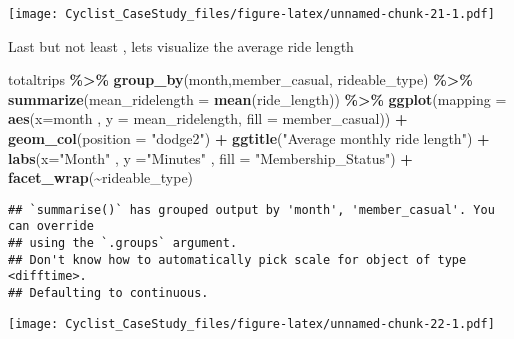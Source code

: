 \documentclass[
]{article}
\newenvironment{Shaded}{\begin{snugshade}}{\end{snugshade}}
\newcommand{\AttributeTok}[1]{\textcolor[rgb]{0.13,0.29,0.53}{#1}}
\newcommand{\FunctionTok}[1]{\textcolor[rgb]{0.13,0.29,0.53}{\textbf{#1}}}
\newcommand{\NormalTok}[1]{#1}
\newcommand{\SpecialCharTok}[1]{\textcolor[rgb]{0.81,0.36,0.00}{\textbf{#1}}}
\newcommand{\StringTok}[1]{\textcolor[rgb]{0.31,0.60,0.02}{#1}}
\begin{document}
\texttt{[image: Cyclist\_CaseStudy\_files/figure-latex/unnamed-chunk-21-1.pdf]}

Last but not least , lets visualize the average ride length

\begin{Shaded}
\begin{Highlighting}[]
\NormalTok{totaltrips }\SpecialCharTok{\%\textgreater{}\%} \FunctionTok{group\_by}\NormalTok{(month,member\_casual, rideable\_type) }\SpecialCharTok{\%\textgreater{}\%} \FunctionTok{summarize}\NormalTok{(}\AttributeTok{mean\_ridelength =} \FunctionTok{mean}\NormalTok{(ride\_length)) }\SpecialCharTok{\%\textgreater{}\%} \FunctionTok{ggplot}\NormalTok{(}\AttributeTok{mapping =} \FunctionTok{aes}\NormalTok{(}\AttributeTok{x=}\NormalTok{month , }\AttributeTok{y =}\NormalTok{ mean\_ridelength, }\AttributeTok{fill =}\NormalTok{ member\_casual)) }\SpecialCharTok{+} \FunctionTok{geom\_col}\NormalTok{(}\AttributeTok{position =} \StringTok{"dodge2"}\NormalTok{) }\SpecialCharTok{+} \FunctionTok{ggtitle}\NormalTok{(}\StringTok{"Average monthly ride length"}\NormalTok{) }\SpecialCharTok{+} \FunctionTok{labs}\NormalTok{(}\AttributeTok{x=}\StringTok{"Month"}\NormalTok{ , }\AttributeTok{y =}\StringTok{"Minutes"}\NormalTok{ , }\AttributeTok{fill =} \StringTok{"Membership\_Status"}\NormalTok{) }\SpecialCharTok{+} \FunctionTok{facet\_wrap}\NormalTok{(}\SpecialCharTok{\textasciitilde{}}\NormalTok{rideable\_type)}
\end{Highlighting}
\end{Shaded}

\begin{verbatim}
## `summarise()` has grouped output by 'month', 'member_casual'. You can override
## using the `.groups` argument.
## Don't know how to automatically pick scale for object of type <difftime>.
## Defaulting to continuous.
\end{verbatim}

\texttt{[image: Cyclist\_CaseStudy\_files/figure-latex/unnamed-chunk-22-1.pdf]}
\end{document}
